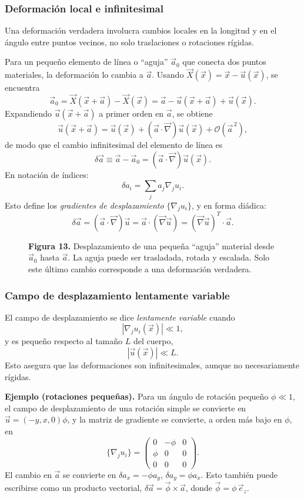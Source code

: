 \subsubsection{Deformación local e infinitesimal}

Una deformación verdadera involucra cambios locales en la longitud y en el ángulo entre puntos vecinos, no solo traslaciones o rotaciones rígidas.

Para un pequeño elemento de línea o ``aguja'' $\vec{a}_0$ que conecta dos puntos materiales, la deformación lo cambia a $\vec{a}$. Usando $\vec{X}(\vec{x}) = \vec{x} - \vec{u}(\vec{x})$, se encuentra
\[ \vec{a}_0 = \vec{X}(\vec{x} + \vec{a}) - \vec{X}(\vec{x}) = \vec{a} - \vec{u}(\vec{x} + \vec{a}) + \vec{u}(\vec{x}). \]
Expandiendo $\vec{u}(\vec{x} + \vec{a})$ a primer orden en $\vec{a}$, se obtiene
\[ \vec{u}(\vec{x} + \vec{a}) = \vec{u}(\vec{x}) + (\vec{a}\cdot\vec{\nabla})\vec{u}(\vec{x}) + \mathcal{O}(\vec{a}^{\,2}), \]
de modo que el cambio infinitesimal del elemento de línea es
\[ \delta\vec{a} \equiv \vec{a} - \vec{a}_0 = (\vec{a}\cdot\vec{\nabla})\vec{u}(\vec{x}). \]
En notación de índices:
\[ \delta a_i = \sum_j a_j \nabla_j u_i. \]
Esto define los \emph{gradientes de desplazamiento} $\{\nabla_j u_i\}$, y en forma diádica:
\[ \delta\vec{a} = (\vec{a}\cdot\vec{\nabla})\vec{u} = \vec{a}\cdot(\vec{\nabla}\vec{u}) = (\vec{\nabla}\vec{u})^{T}\cdot\vec{a}. \]

\begin{figure}[H]
\centering

\par\medskip
\textbf{Figura 13.} Desplazamiento de una pequeña ``aguja'' material desde $\vec{a}_0$ hasta $\vec{a}$. La aguja puede ser trasladada, rotada y escalada. Solo este último cambio corresponde a una deformación verdadera.
\end{figure}

\subsubsection{Campo de desplazamiento lentamente variable}

El campo de desplazamiento se dice \emph{lentamente variable} cuando
\[ |\nabla_j u_i(\vec{x})| \ll 1, \]
y es pequeño respecto al tamaño $L$ del cuerpo,
\[ |\vec{u}(\vec{x})| \ll L. \]
Esto asegura que las deformaciones son infinitesimales, aunque no necesariamente rígidas.

\textbf{Ejemplo (rotaciones pequeñas).} Para un ángulo de rotación pequeño $\phi \ll 1$, el campo de desplazamiento de una rotación simple se convierte en $\vec{u} = (-y, x, 0)\phi$, y la matriz de gradiente se convierte, a orden más bajo en $\phi$, en
\[ \{\nabla_j u_i\} = \begin{pmatrix} 0 & -\phi & 0 \\ \phi & 0 & 0 \\ 0 & 0 & 0 \end{pmatrix}. \]
El cambio en $\vec{a}$ se convierte en $\delta a_x = -\phi a_y$, $\delta a_y = \phi a_x$. Esto también puede escribirse como un producto vectorial, $\delta\vec{a} = \vec{\phi}\times\vec{a}$, donde $\vec{\phi} = \phi\,\vec{e}_z$.

